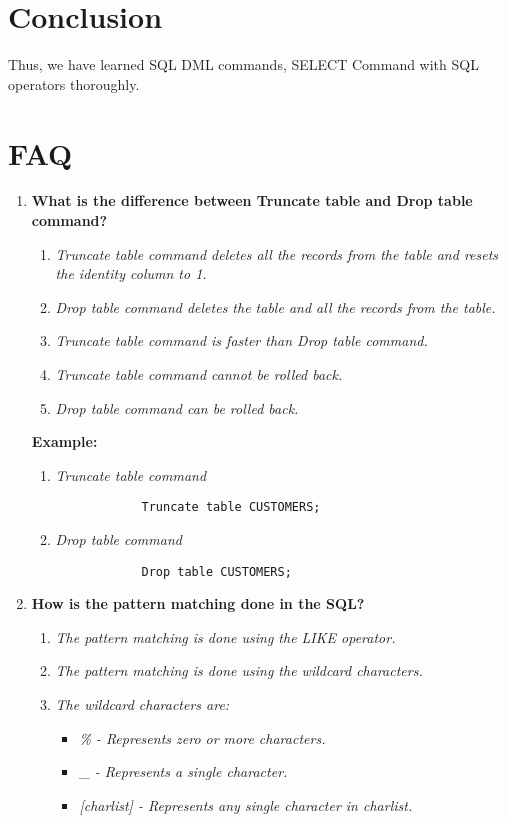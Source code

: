 \documentclass[11pt]{article}
\begin{document}
\section{Conclusion}
Thus, we have learned SQL DML commands, SELECT Command with SQL operators thoroughly.
\clearpage

\section{FAQ}
\begin{enumerate}
	\item \textbf{What is the difference between Truncate table and Drop table command?}

	      \begin{enumerate}
		      \item \textit{Truncate table command deletes all the records from the table and resets the identity column to 1.}
		      \item \textit{Drop table command deletes the table and all the records from the table.}
		      \item \textit{Truncate table command is faster than Drop table command.}
		      \item \textit{Truncate table command cannot be rolled back.}
		      \item \textit{Drop table command can be rolled back.}
	      \end{enumerate}

	      \textbf{Example:}
	      \begin{enumerate}
		      \item \textit{Truncate table command}
		            \begin{verbatim}
			Truncate table CUSTOMERS;
		\end{verbatim}
		      \item \textit{Drop table command}
		            \begin{verbatim}
			Drop table CUSTOMERS;
		\end{verbatim}
	      \end{enumerate}

	\item \textbf{How is the pattern matching done in the SQL?}

	      \begin{enumerate}
		      \item \textit{The pattern matching is done using the LIKE operator.}
		      \item \textit{The pattern matching is done using the wildcard characters.}
		      \item \textit{The wildcard characters are:}
		            \begin{itemize}
			            \item \textit{\% - Represents zero or more characters.}
			            \item \textit{\_ - Represents a single character.}
			            \item \textit{[charlist] - Represents any single character in charlist.}
		            \end{itemize}
	      \end{enumerate}


\end{enumerate}
\end{document}
